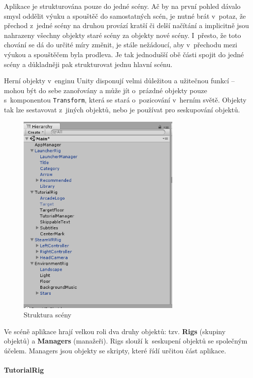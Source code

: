 Aplikace je strukturována pouze do jedné scény. Ač by na první pohled
dávalo smysl oddělit výuku a spouštěč do samostatných scén, je nutné
brát v~potaz, že přechod z~jedné scény na druhou provází kratší či delší
načítání a implicitně jsou nahrazeny všechny objekty staré scény za
objekty nové scény. I~přesto, že toto chování se dá do určité míry
změnit, je stále nežádoucí, aby v~přechodu mezi výukou a spouštěčem
byla prodleva. Je tak jednodušší obě části spojit do jedné scény a
důkladněji pak strukturovat jednu hlavní scénu.

Herní objekty v~enginu Unity disponují velmi důležitou a užitečnou
funkcí -- mohou být do sebe zanořovány a může jít o~prázdné objekty
pouze s~komponentou \texttt{Transform}, která se stará o~pozicování
v~herním světě. Objekty tak lze sestavovat z~jiných objektů, nebo je
používat pro seskupování objektů.

\newpage

\begin{figure}[h!]
\centering
\includegraphics[height=10cm]{src/assets/structure.png}
\caption{Struktura scény}
\end{figure}

Ve scéně aplikace hrají velkou roli dva druhy objektů: tzv.
\textbf{Rigs} (skupiny objektů) a \textbf{Managers} (manažeři). Rigs
slouží k~seskupení objektů se společným účelem. Managers jsou 
objekty se skripty, které řídí určitou část aplikace.

\paragraph{TutorialRig}\label{tutorialrig}

